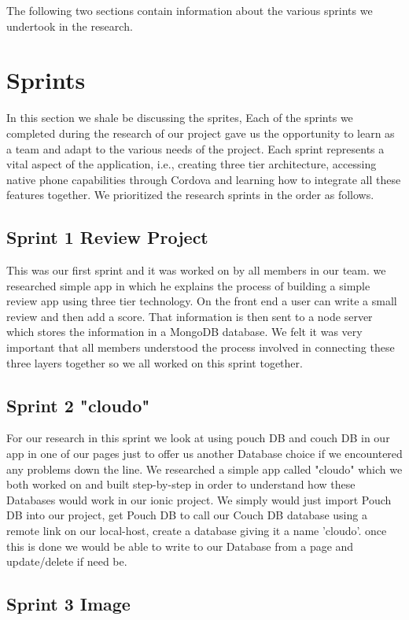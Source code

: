 \documentclass[12pt,a4paper,oneside,openany]{book}
\begin{document}
\noindent The following two sections contain information about the various sprints we undertook in the research. \\


\section{Sprints} \label{reseacrh_sprints}
In this section we shale be discussing the sprites, Each of the sprints we completed during the research of our project gave us the opportunity to learn as a team and adapt to the various needs of the project. Each sprint represents a vital aspect of the application, i.e., creating three tier architecture, accessing native phone capabilities through Cordova and learning how to integrate all these features together. We prioritized the research sprints in the order as follows.

\subsection{Sprint 1 Review Project}
This was our first sprint and it was worked on by all members in our team. we researched simple app in which he explains the process of building a simple review app using three tier technology. On the front end a user can write a small review and then add a score. That information is then sent to a node server which stores the information in a MongoDB database. We felt it was very important that all members understood the process involved in connecting these three layers together so we all worked on this sprint together.   

\subsection{Sprint 2 "cloudo"}
For our research in this sprint we look at using pouch DB and couch DB in our app in one of our pages just to offer us another Database choice if we encountered any problems down the line. We researched a simple app called "cloudo" which we both worked on and built step-by-step in order to understand how these Databases would work in our ionic project. We simply would just import Pouch DB into our project, get Pouch DB to call our Couch DB database using a remote link on our local-host, create a database giving it a name 'cloudo'. once this is done we would be able to write to our Database from a page and update/delete if need be.

\subsection{Sprint 3 Image}
\end{document}
